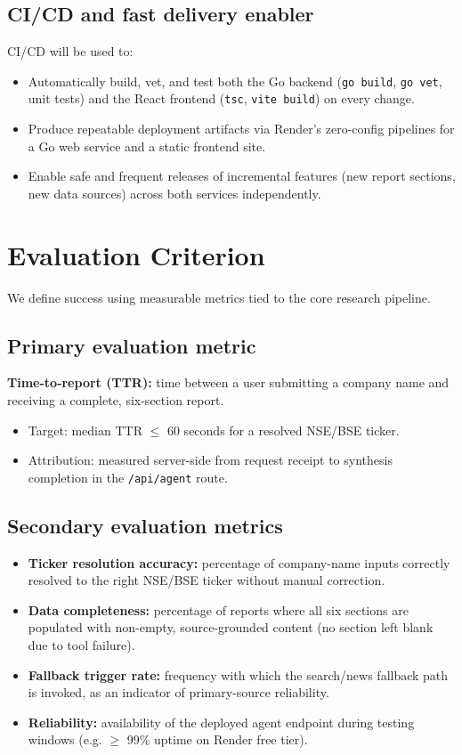 \documentclass[11pt,a4paper]{article}
\begin{document}
\subsection{CI/CD and fast delivery enabler}
CI/CD will be used to:
\begin{itemize}[leftmargin=0.7cm]
    \item Automatically build, vet, and test both the Go backend (\texttt{go build}, \texttt{go vet}, unit tests) and the React frontend (\texttt{tsc}, \texttt{vite build}) on every change.
    \item Produce repeatable deployment artifacts via Render's zero-config pipelines for a Go web service and a static frontend site.
    \item Enable safe and frequent releases of incremental features (new report sections, new data sources) across both services independently.
\end{itemize}

\section{Evaluation Criterion}
We define success using measurable metrics tied to the core research pipeline.

\subsection{Primary evaluation metric}
\textbf{Time-to-report (TTR):} time between a user submitting a company name and receiving a complete, six-section report.
\begin{itemize}[leftmargin=0.7cm]
    \item Target: median TTR $\le$ 60 seconds for a resolved NSE/BSE ticker.
    \item Attribution: measured server-side from request receipt to synthesis completion in the \texttt{/api/agent} route.
\end{itemize}

\subsection{Secondary evaluation metrics}
\begin{itemize}[leftmargin=0.7cm]
    \item \textbf{Ticker resolution accuracy:} percentage of company-name inputs correctly resolved to the right NSE/BSE ticker without manual correction.
    \item \textbf{Data completeness:} percentage of reports where all six sections are populated with non-empty, source-grounded content (no section left blank due to tool failure).
    \item \textbf{Fallback trigger rate:} frequency with which the search/news fallback path is invoked, as an indicator of primary-source reliability.
    \item \textbf{Reliability:} availability of the deployed agent endpoint during testing windows (e.g. $\ge$ 99\% uptime on Render free tier).
\end{itemize}
\end{document}
